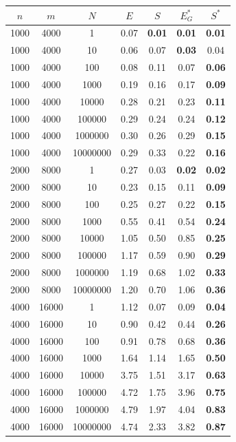 \begin{table}
\centering
\begin{tabular}{
ccc|cc|cc}
$n$ & $m$ & $N$ & $E$ & $S$ & $E^*_G$ & $S^*$ \\
\hline
1000 & 4000 & 1 & 0.07 & \textbf{0.01} & \textbf{0.01} & \textbf{0.01} \\
1000 & 4000 & 10 & 0.06 & 0.07 & \textbf{0.03} & 0.04 \\
1000 & 4000 & 100 & 0.08 & 0.11 & 0.07 & \textbf{0.06} \\
1000 & 4000 & 1000 & 0.19 & 0.16 & 0.17 & \textbf{0.09} \\
1000 & 4000 & 10000 & 0.28 & 0.21 & 0.23 & \textbf{0.11} \\
1000 & 4000 & 100000 & 0.29 & 0.24 & 0.24 & \textbf{0.12} \\
1000 & 4000 & 1000000 & 0.30 & 0.26 & 0.29 & \textbf{0.15} \\
1000 & 4000 & 10000000 & 0.29 & 0.33 & 0.22 & \textbf{0.16} \\
\hline
2000 & 8000 & 1 & 0.27 & 0.03 & \textbf{0.02} & \textbf{0.02} \\
2000 & 8000 & 10 & 0.23 & 0.15 & 0.11 & \textbf{0.09} \\
2000 & 8000 & 100 & 0.25 & 0.27 & 0.22 & \textbf{0.15} \\
2000 & 8000 & 1000 & 0.55 & 0.41 & 0.54 & \textbf{0.24} \\
2000 & 8000 & 10000 & 1.05 & 0.50 & 0.85 & \textbf{0.25} \\
2000 & 8000 & 100000 & 1.17 & 0.59 & 0.90 & \textbf{0.29} \\
2000 & 8000 & 1000000 & 1.19 & 0.68 & 1.02 & \textbf{0.33} \\
2000 & 8000 & 10000000 & 1.20 & 0.70 & 1.06 & \textbf{0.36} \\
\hline
4000 & 16000 & 1 & 1.12 & 0.07 & 0.09 & \textbf{0.04} \\
4000 & 16000 & 10 & 0.90 & 0.42 & 0.44 & \textbf{0.26} \\
4000 & 16000 & 100 & 0.91 & 0.78 & 0.68 & \textbf{0.36} \\
4000 & 16000 & 1000 & 1.64 & 1.14 & 1.65 & \textbf{0.50} \\
4000 & 16000 & 10000 & 3.75 & 1.51 & 3.17 & \textbf{0.63} \\
4000 & 16000 & 100000 & 4.72 & 1.75 & 3.96 & \textbf{0.75} \\
4000 & 16000 & 1000000 & 4.79 & 1.97 & 4.04 & \textbf{0.83} \\
4000 & 16000 & 10000000 & 4.74 & 2.33 & 3.82 & \textbf{0.87} \\

\end{tabular}
\end{table}
